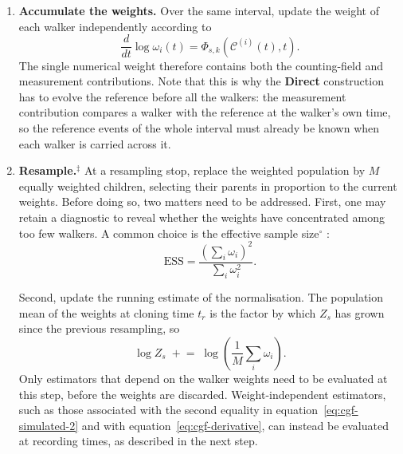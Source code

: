 \documentclass[11pt]{article}
\begin{document}
\begin{mdframed}[
    linewidth=0.8pt,
    roundcorner=3pt,
    backgroundcolor=black!5,
    innerleftmargin=8pt,
    innerrightmargin=8pt,
    innertopmargin=8pt,
    innerbottommargin=8pt]
\begin{enumerate}
\item \textbf{Accumulate the weights.} Over the same interval, update the weight of each walker independently according to
\begin{equation}
    \frac{d}{dt}\log \omega_i(t)
    =\Phi_{s,k}(\mathcal{C}^{(i)}(t),t).
\label{eq:walker-weight}
\end{equation}
The single numerical weight therefore contains both the counting-field and measurement contributions. Note that this is why the \textcolor{dircol}{\textbf{Direct}} construction has to evolve the reference before all the walkers: the measurement contribution compares a walker with the reference at the walker's own time, so the reference events of the whole interval must already be known when each walker is carried across it.

\item \textbf{Resample.}$^{\ddagger}$ At a resampling stop, replace the weighted population by $M$ equally weighted children, selecting their parents in proportion to the current weights. Before doing so, two matters need to be addressed. First, one may retain a diagnostic to reveal whether the weights have concentrated among too few walkers. A common choice is the effective sample size$^{\circ}$ \cite{kong1994sequential}:
\begin{equation}
    \text{ESS}=\frac{\left(\sum_i \omega_i\right)^2}{\sum_i \omega_i^2}.
    \label{eq:ess}
\end{equation}

Second, update the running estimate of the normalisation. The population mean of the weights at cloning time $t_r$ is the factor by which $Z_s$ has grown since the previous resampling, so
\begin{equation}
\log Z_s \;\mathrel{+}=\;
\log\!\left(\frac{1}{M}\sum_i \omega_i\right).
\end{equation}
Only estimators that depend on the walker weights need to be evaluated at this step, before the weights are discarded. Weight-independent estimators, such as those associated with the second equality in equation~\ref{eq:cgf-simulated-2} and with equation~\ref{eq:cgf-derivative}, can instead be evaluated at recording times, as described in the next step.


\end{enumerate}
\end{mdframed}
\end{document}
